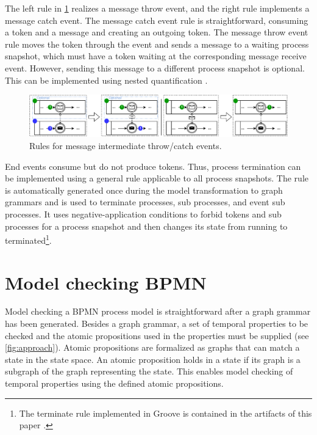 \documentclass[submission, copyright, creativecommons]{eptcs}
\begin{document}
The left rule in \cref{fig:messageEventRules} realizes a message throw event, and the right rule implements a message catch event.
The message catch event rule is straightforward, consuming a token and a message and creating an outgoing token.
The message throw event rule moves the token through the event and sends a message to a waiting process snapshot, which must have a token waiting at the corresponding message receive event.
However, sending this message to a different process snapshot is optional.
This can be implemented using nested quantification \cite{rensinkNestedQuantificationGraph2006}.

\begin{figure}[h]
    \centering
    \includegraphics[width=1\textwidth]{images/bpmn_semantics-message-events.pdf}
    \caption{Rules for message intermediate throw/catch events.}
    \label{fig:messageEventRules}
\end{figure}

End events consume but do not produce tokens.
Thus, process termination can be implemented using a general rule applicable to all process snapshots.
The rule is automatically generated once during the model transformation to graph grammars and is used to terminate processes, sub processes, and event sub processes.
It uses negative-application conditions to forbid tokens and sub processes for a process snapshot and then changes its state from running to terminated\footnote{The terminate rule implemented in Groove is contained in the artifacts of this paper \cite{timkrauterArtifactsTERMGRAPH2022}.}.

\section{Model checking BPMN} \label{sec:modelChecking}

Model checking a BPMN process model is straightforward after a graph grammar has been generated.
Besides a graph grammar, a set of temporal properties to be checked and the atomic propositions used in the properties must be supplied (see \cref{fig:approach}).
Atomic propositions are formalized as graphs that can match a state in the state space.
An atomic proposition holds in a state if its graph is a subgraph of the graph representing the state.
This enables model checking of temporal properties using the defined atomic propositions.
\end{document}
